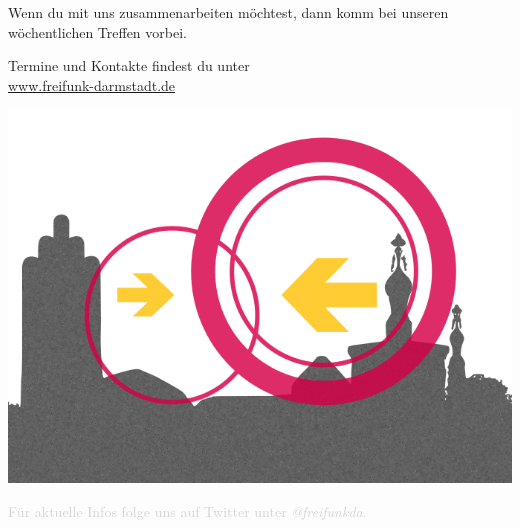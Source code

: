 \documentclass[a4paper]{article}
\begin{document}
\vspace{1.3cm}
\begin{Row}
    \begin{Cell}{1}
	Wenn du mit uns zusammenarbeiten möchtest, dann komm bei unseren wöchentlichen Treffen vorbei.
	\end{Cell}
\end{Row}
\vspace{0.5cm}
\begin{center}
	\large Termine und Kontakte findest du unter \\
	\url{www.freifunk-darmstadt.de}
\end{center}
\begin{center}
\vspace{-0.5cm}
\hspace*{-0.05 \paperwidth}\includegraphics[width=\paperwidth]{DA-logo_trans}

\vspace{-2cm}
\large \textcolor{lightgrey}{Für aktuelle Infos folge uns auf Twitter unter \textit{@freifunkda}.}
\end{center}
\end{document}
